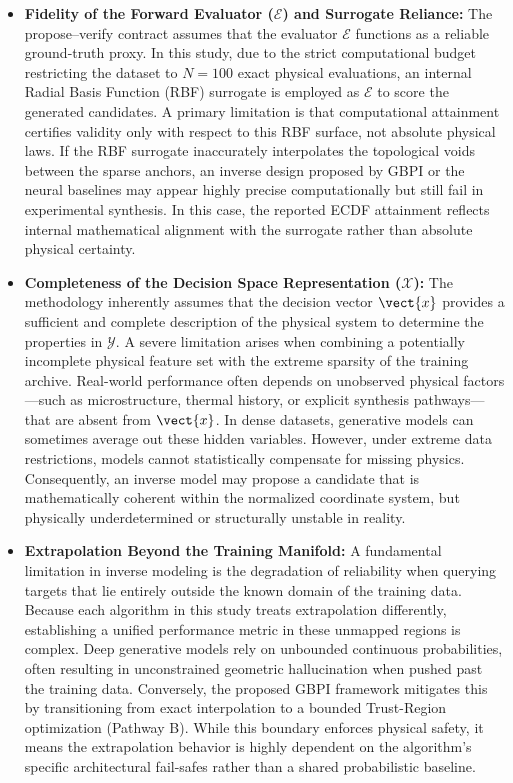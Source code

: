 \begin{itemize}
  \item \textbf{Fidelity of the Forward Evaluator ($\mathcal{E}$) and Surrogate Reliance:} 
  The propose--verify contract assumes that the evaluator $\mathcal{E}$ functions as a reliable ground-truth proxy. In this study, due to the strict computational budget restricting the dataset to $N=100$ exact physical evaluations, an internal Radial Basis Function (RBF) surrogate is employed as $\mathcal{E}$ to score the generated candidates. A primary limitation is that computational attainment certifies validity only with respect to this RBF surface, not absolute physical laws. If the RBF surrogate inaccurately interpolates the topological voids between the sparse anchors, an inverse design proposed by GBPI or the neural baselines may appear highly precise computationally but still fail in experimental synthesis. In this case, the reported ECDF attainment reflects internal mathematical alignment with the surrogate rather than absolute physical certainty.

  \item \textbf{Completeness of the Decision Space Representation ($\mathcal{X}$):} 
  The methodology inherently assumes that the decision vector $\vect{x}$ provides a sufficient and complete description of the physical system to determine the properties in $\mathcal{Y}$. A severe limitation arises when combining a potentially incomplete physical feature set with the extreme sparsity of the training archive. Real-world performance often depends on unobserved physical factors—such as microstructure, thermal history, or explicit synthesis pathways—that are absent from $\vect{x}$. In dense datasets, generative models can sometimes average out these hidden variables. However, under extreme data restrictions, models cannot statistically compensate for missing physics. Consequently, an inverse model may propose a candidate that is mathematically coherent within the normalized coordinate system, but physically underdetermined or structurally unstable in reality.

  \item \textbf{Extrapolation Beyond the Training Manifold:} 
  A fundamental limitation in inverse modeling is the degradation of reliability when querying targets that lie entirely outside the known domain of the training data. Because each algorithm in this study treats extrapolation differently, establishing a unified performance metric in these unmapped regions is complex. Deep generative models rely on unbounded continuous probabilities, often resulting in unconstrained geometric hallucination when pushed past the training data. Conversely, the proposed GBPI framework mitigates this by transitioning from exact interpolation to a bounded Trust-Region optimization (Pathway B). While this boundary enforces physical safety, it means the extrapolation behavior is highly dependent on the algorithm's specific architectural fail-safes rather than a shared probabilistic baseline.


\end{itemize}
